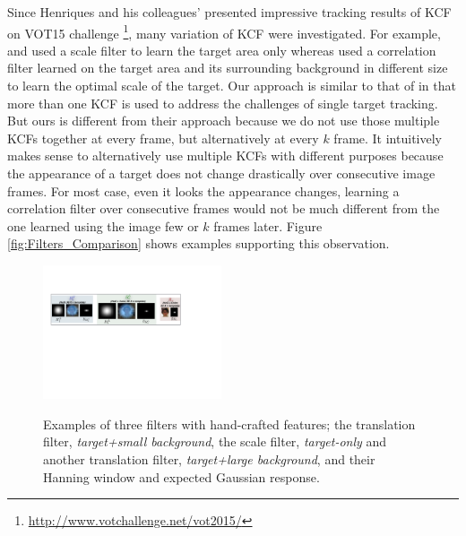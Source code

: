 \documentclass[10pt,twocolumn,letterpaper]{article}
\begin{document}
Since Henriques and his colleagues' presented impressive tracking
results of KCF \cite{henriques2015high} on VOT15
challenge \footnote{\url{http://www.votchallenge.net/vot2015/}}, many
variation of KCF were investigated. For example, \cite{ma2015long} and
\cite{danelljan2014accurate} used a scale filter to learn the target
area only whereas \cite{li2014scale, bibi2015multi, tang2015multi}
used a correlation filter learned on the target area and its
surrounding background in different size to learn the optimal scale of
the target. Our approach is similar to that of \cite{ma2015long} in
that more than one KCF is used to address the challenges of single
target tracking. But ours is different from their approach because we
do not use those multiple KCFs together at every frame, but
alternatively at every $k$ frame. It intuitively makes sense to
alternatively use multiple KCFs with different purposes because the
appearance of a target does not change drastically over consecutive
image frames. For most case, even it looks the appearance changes,
learning a correlation filter over consecutive frames would not be
much different from the one learned using the image few or $k$ frames
later. Figure \ref{fig:Filters_Comparison} shows examples supporting
this observation.
\begin{figure}[!h]
\centering
\includegraphics[width=0.47\textwidth]{./figures/Filters_Details.pdf}
   \\[-3ex]
\label{fig:Rt_S}
\quad{}\label{fig:Rt_L}
\quad\quad{}\label{fig:Rs}
\caption{Examples of three filters with hand-crafted features; the translation filter,
  \textit{target+small background}, the scale filter,
  \textit{target-only} and another translation filter,
  \textit{target+large background}, and their Hanning window and
  expected Gaussian response.}
\label{fig:Filters}
\end{figure}
\end{document}
